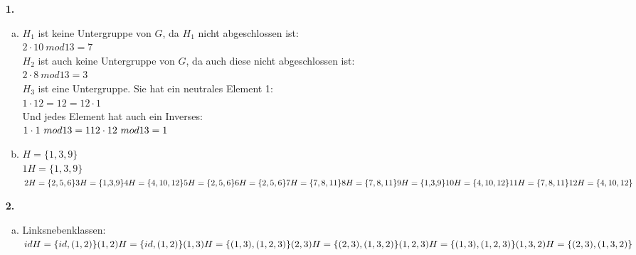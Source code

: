 \documentclass[a4paper]{scrartcl}
\title{\titleinfo}
\author{Elena Noll, Sven-Hendrik Haase, Arne Feil}
\date{\today}
\begin{document}
\maketitle

\begin{enumerate}
\item[\textbf{1.}]
\begin{enumerate}[a)]
\item
$H_1$ ist keine Untergruppe von $G$, da $H_1$ nicht abgeschlossen ist:\\
$2\cdot 10~mod 13 = 7$\\
$H_2$ ist auch keine Untergruppe von $G$, da auch diese nicht abgeschlossen ist:\\
$2\cdot 8~mod 13 = 3$\\
$H_3$ ist eine Untergruppe. Sie hat ein neutrales Element 1:\\
$1\cdot 12 = 12 = 12 \cdot 1$\\
Und jedes Element hat auch ein Inverses:\\
$1\cdot 1~mod 13 = 1\\
12\cdot 12~mod 13 = 1$
\item 
$H = \{1{,}3{,}9\}$\\
$1H = \{1{,}3{,}9\}$\\
$2H = \{2,5,6\} \\
 3H = \{1{,}3{,}9\} \\
 4H = \{4,10,12\} \\
 5H = \{2,5,6\} \\
 6H = \{2,5,6\} \\
 7H = \{7,8,11\} \\
 8H = \{7,8,11\} \\
 9H = \{1{,}3{,}9\} \\
10H = \{4,10,12\} \\
11H = \{7,8,11\} \\
12H = \{4,10,12\} $
\end{enumerate}
\item[\textbf{2.}]
\begin{enumerate}[a)]
\item
Linksnebenklassen:\\
$idH = \{ id , (1,2) \} \\
(1,2)H = \{ id , (1,2)\} \\
(1,3)H = \{ (1,3) , (1,2,3) \} \\
(2,3)H = \{ (2,3) , (1,3,2) \} \\
(1,2,3)H = \{ (1,3) , (1,2,3) \} \\
(1,3,2)H = \{ (2,3) , (1,3,2) \}$ \\ \\

\end{enumerate}
\end{enumerate}
\end{document}
